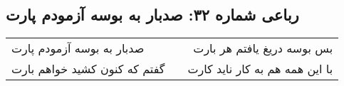 \begin{center}
\section*{رباعی شماره ۳۲: صدبار به بوسه آزمودم پارت}
\label{sec:sh032}
\begin{longtable}{l p{0.5cm} r}
صدبار به بوسه آزمودم پارت
&&
بس بوسه دریغ یافتم هر بارت
\\
گفتم که کنون کشید خواهم بارت
&&
با این همه هم به کار ناید کارت
\\
\end{longtable}
\end{center}
